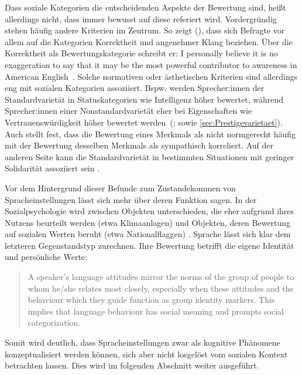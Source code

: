 Dass soziale Kategorien die entscheidenden Aspekte der Bewertung sind, heißt allerdings nicht, dass immer bewusst auf diese referiert wird. 
Vordergründig stehen häufig andere Kriterien im Zentrum. 
So zeigt \citeauthor{Preston2004} (\citeyear{Preston1996, Preston2004, Preston2005}), dass sich Befragte vor allem auf die Kategorien Korrektheit und angenehmer Klang beziehen. 
Über die Korrektheit als Bewertungskategorie schreibt er: {\glqq}I personally believe it is no exaggeration to say that it may be the most powerful contributor to awareness in American English{\grqq}~\citep[54]{Preston1996}. 
Solche normativen oder ästhetischen Kriterien sind allerdings eng mit sozialen Kategorien assoziiert. 
Bspw. werden Sprecher:innen der Standardvarietät in Statuskategorien wie Intelligenz h{\"o}her bewertet, w{\"a}hrend Sprecher:innen einer Nonstandardvariet{\"a}t eher bei Eigenschaften wie Vertrauensw{\"u}rdigkeit h{\"o}her bewertet werden~(\citealp[s.][155]{Creber.1983}; sowie \autoref{sec:Prestigevarietaet}). 
Auch \citet[732]{Neuland.1993} stellt fest, dass die Bewertung eines Merkmals als nicht normgerecht h{\"a}ufig mit der Bewertung desselben Merkmals als sympathisch korreliert. 
Auf der anderen Seite kann die Standardvarietät in bestimmten Situationen mit geringer Solidarität assoziiert sein \citep[s.][586--587]{Giles.1988}.

Vor dem Hintergrund dieser Befunde zum Zustandekommen von Spracheinstellungen lässt sich mehr über deren Funktion sagen. 
In der Sozialpsychologie wird zwischen Objekten unterschieden, die eher aufgrund ihres Nutzens beurteilt werden (etwa Klimaanlagen) und Objekten, deren Bewertung auf sozialen Werten beruht (etwa Nationalflaggen) \citep[s.][210]{Jonas.2014}. 
Sprache lässt sich klar dem letzteren Gegenstandstyp zurechnen. 
Ihre Bewertung betrifft die eigene Identität und persönliche Werte: 
\begin{quote} A speaker's language attitudes mirror the norms of the group of people to whom he/she relates most closely, especially when these attitudes and the behaviour which they guide function as group identity markers. This implies that language behaviour has social meaning and prompts social categorization. \citep[1321]{Vandermeeren2005} \end{quote} 
Somit wird deutlich, dass Spracheinstellungen zwar als kognitive Phänomene konzeptualisiert werden können, sich aber nicht losgelöst vom sozialen Kontext betrachten lassen. 
Dies wird im folgenden Abschnitt weiter ausgeführt. 
